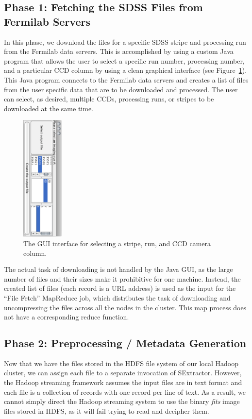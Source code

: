 \subsection{Phase 1: Fetching the SDSS Files from Fermilab Servers}
In this phase, we download the files for a specific SDSS stripe and processing run from the Fermilab data servers. This is accomplished by using a custom Java program that allows the user to select a specific run number, processing number, and a particular CCD column by using a clean graphical interface (see Figure~\ref{gui}). This Java program connects to the Fermilab data servers and creates a list of files from the user specific data that are to be downloaded and processed. The user can select, as desired, multiple CCDs, processing runs, or stripes to be downloaded at the same time.


\begin{figure}[h!]
	\vspace{0in}
	\centering
	\includegraphics[height=2.5in, angle=90]{part4/Farivar_O12/javaGui.eps}
	\caption{The GUI interface for selecting a stripe, run, and CCD camera column.}
	\label{gui}
\end{figure}



The actual task of downloading is not handled by the Java GUI, as the large number of files and their sizes make it prohibitive for one machine. Instead, the created list of files (each record is a URL address) is used as the input for the ``File Fetch'' MapReduce job, which distributes the task of downloading and uncompressing the files across all the nodes in the cluster. 
This map process does not have a corresponding reduce function.

\subsection{Phase 2: Preprocessing / Metadata Generation}
Now that we have the files stored in the HDFS file system of our local Hadoop cluster, we can assign each file to a separate invocation of SExtractor. However, the Hadoop streaming framework assumes the input files are in text format and each file is a collection of records with one record per line of text. As a result, we cannot simply direct the Hadoop streaming system to use the binary \textit{fits} image files stored in HDFS, as it will fail trying to read and decipher them.

